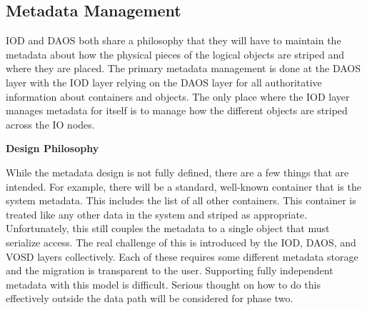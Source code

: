 \documentclass{sig-alt-gov2}
\begin{document}
\subsection{Metadata Management}


IOD and DAOS both share a philosophy that they will have to maintain the
metadata about how the physical pieces of the logical objects are striped and
where they are placed. The primary metadata management is done at the DAOS
layer with the IOD layer relying on the DAOS layer for all authoritative
information about containers and objects. The only place where the IOD layer
manages metadata for itself is to manage how the different objects are striped
across the IO nodes.

\noindent\textbf{Design Philosophy}

While the metadata design is not fully defined, there are a few things that
are intended. For example, there will be a standard, well-known container that
is the system metadata. This includes the list of all other containers. This
container is treated like any other data in the system and striped as
appropriate. Unfortunately, this still couples the metadata to a single object
that must serialize access.
The real challenge of
this is introduced by the IOD, DAOS, and VOSD layers collectively. Each of
these requires some different metadata storage and the migration is transparent
to the user.  Supporting fully independent metadata with this model is
difficult. Serious thought on how to do this effectively outside the data path
will be considered for phase two.
\end{document}
